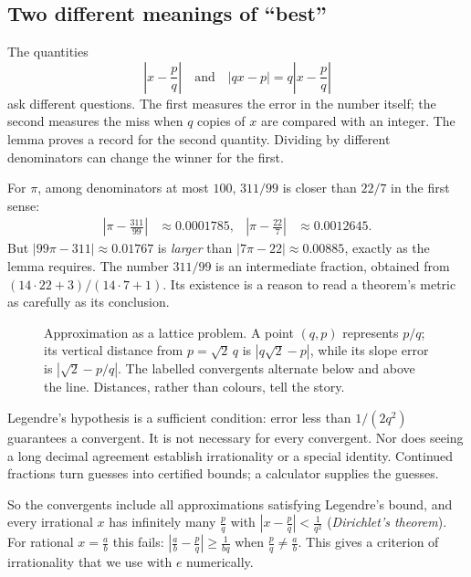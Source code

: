 \subsection*{Two different meanings of ``best''}
The quantities
\[
\left|x-\frac pq\right|\quad\text{and}\quad|qx-p|=q\left|x-\frac pq\right|
\]
ask different questions. The first measures the error in the number itself; the second measures the miss when $q$ copies of $x$ are compared with an integer. The lemma proves a record for the second quantity. Dividing by different denominators can change the winner for the first.

For $\pi$, among denominators at most $100$, $311/99$ is closer than $22/7$ in the first sense:
\[
\begin{aligned}
\left|\pi-\frac{311}{99}\right|&\approx0.0001785,
&\left|\pi-\frac{22}7\right|&\approx0.0012645.
\end{aligned}
\]
But $|99\pi-311|\approx0.01767$ is \emph{larger} than $|7\pi-22|\approx0.00885$, exactly as the lemma requires. The number $311/99$ is an intermediate fraction, obtained from $(14\cdot22+3)/(14\cdot7+1)$. Its existence is a reason to read a theorem's metric as carefully as its conclusion.

\begin{figure}[ht]
\centering
{}
\caption{Approximation as a lattice problem. A point $(q,p)$ represents $p/q$; its vertical distance from $p=\sqrt2\,q$ is $|q\sqrt2-p|$, while its slope error is $|\sqrt2-p/q|$. The labelled convergents alternate below and above the line. Distances, rather than colours, tell the story.}
\label{fig:cflattice}
\end{figure}

\begin{reminder}
Legendre's hypothesis is a sufficient condition: error less than $1/(2q^2)$ guarantees a convergent. It is not necessary for every convergent. Nor does seeing a long decimal agreement establish irrationality or a special identity. Continued fractions turn guesses into certified bounds; a calculator supplies the guesses.
\end{reminder}

So the convergents include all approximations satisfying Legendre's bound, and every irrational $x$ has infinitely many $\frac pq$ with $\left|x-\frac pq\right|<\frac1{q^2}$ (\emph{Dirichlet's theorem}). For rational $x=\frac ab$ this fails: $\left|\frac ab-\frac pq\right|\ge\frac1{bq}$ when $\frac pq\ne\frac ab$. This gives a criterion of irrationality that we use with $e$ numerically.

